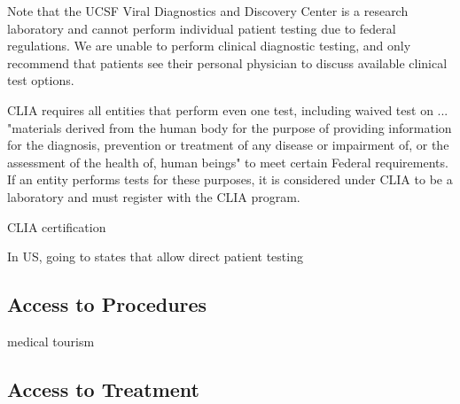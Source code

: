 \documentclass{article}
\begin{document}
Note that the UCSF Viral Diagnostics and Discovery Center is a research laboratory and cannot perform individual patient testing due to federal regulations. We are unable to perform clinical diagnostic testing, and only recommend that patients see their personal physician to discuss available clinical test options.

CLIA requires all entities that perform even one test, including waived test on ... "materials derived from the human body for the purpose of providing information for the diagnosis, prevention or treatment of any disease or impairment of, or the assessment of the health of, human beings" to meet certain Federal requirements. If an entity performs tests for these purposes, it is considered under CLIA to be a laboratory and must register with the CLIA program.

CLIA certification



In US, going to states that allow direct patient testing

\subsection{Access to Procedures}

medical tourism\\



\subsection{Access to Treatment}
\end{document}
